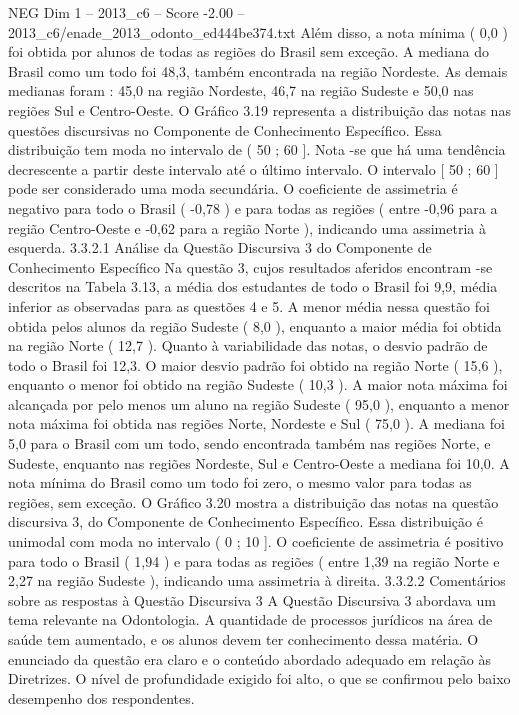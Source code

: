 \begin{textsample}{NEG Dim 1 – 2013\_c6 – Score -2.00 – 2013\_c6/enade\_2013\_odonto\_ed444be374.txt}
Além disso, a nota mínima ( 0,0 ) foi obtida por alunos de todas as regiões do Brasil sem exceção.
A mediana do Brasil como um todo foi 48,3, também encontrada na região Nordeste.
As demais medianas foram : 45,0 na região Nordeste, 46,7 na região Sudeste e 50,0 nas regiões Sul e Centro-Oeste.
O Gráfico 3.19 representa a distribuição das notas nas questões discursivas no Componente de Conhecimento Específico.
Essa distribuição tem moda no intervalo de ( 50 ; 60 ].
Nota -se que há uma tendência decrescente a partir deste intervalo até o último intervalo.
O intervalo [ 50 ; 60 ] pode ser considerado uma moda secundária.
O coeficiente de assimetria é negativo para todo o Brasil ( -0,78 ) e para todas as regiões ( entre -0,96 para a região Centro-Oeste e -0,62 para a região Norte ), indicando uma assimetria à esquerda. 3.3.2.1 Análise da Questão Discursiva 3 do Componente de Conhecimento Específico Na questão 3, cujos resultados aferidos encontram -se descritos na Tabela 3.13, a média dos estudantes de todo o Brasil foi 9,9, média inferior as observadas para as questões 4 e 5.
A menor média nessa questão foi obtida pelos alunos da região Sudeste ( 8,0 ), enquanto a maior média foi obtida na região Norte ( 12,7 ).
Quanto à variabilidade das notas, o desvio padrão de todo o Brasil foi 12,3.
O maior desvio padrão foi obtido na região Norte ( 15,6 ), enquanto o menor foi obtido na região Sudeste ( 10,3 ).
A maior nota máxima foi alcançada por pelo menos um aluno na região Sudeste ( 95,0 ), enquanto a menor nota máxima foi obtida nas regiões Norte, Nordeste e Sul ( 75,0 ).
A mediana foi 5,0 para o Brasil com um todo, sendo encontrada também nas regiões Norte, e Sudeste, enquanto nas regiões Nordeste, Sul e Centro-Oeste a mediana foi 10,0.
A nota mínima do Brasil como um todo foi zero, o mesmo valor para todas as regiões, sem exceção.
O Gráfico 3.20 mostra a distribuição das notas na questão discursiva 3, do Componente de Conhecimento Específico.
Essa distribuição é unimodal com moda no intervalo ( 0 ; 10 ].
O coeficiente de assimetria é positivo para todo o Brasil ( 1,94 ) e para todas as regiões ( entre 1,39 na região Norte e 2,27 na região Sudeste ), indicando uma assimetria à direita. 3.3.2.2 Comentários sobre as respostas à Questão Discursiva 3 A Questão Discursiva 3 abordava um tema relevante na Odontologia.
A quantidade de processos jurídicos na área de saúde tem aumentado, e os alunos devem ter conhecimento dessa matéria.
O enunciado da questão era claro e o conteúdo abordado adequado em relação às Diretrizes.
O nível de profundidade exigido foi alto, o que se confirmou pelo baixo desempenho dos respondentes.

\end{textsample}
